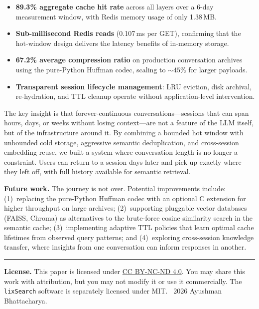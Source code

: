 \documentclass[conference]{IEEEtran}
\begin{document}
\begin{itemize}
\item \textbf{89.3\% aggregate cache hit rate} across all layers over a 6-day measurement window, with Redis memory usage of only 1.38\,MB.
\item \textbf{Sub-millisecond Redis reads} (0.107\,ms per GET), confirming that the hot-window design delivers the latency benefits of in-memory storage.
\item \textbf{67.2\% average compression ratio} on production conversation archives using the pure-Python Huffman codec, scaling to ${\sim}45\%$ for larger payloads.
\item \textbf{Transparent session lifecycle management}: LRU eviction, disk archival, re-hydration, and TTL cleanup operate without application-level intervention.
\end{itemize}

The key insight is that forever-continuous conversations---sessions that can span hours, days, or weeks without losing context---are not a feature of the LLM itself, but of the infrastructure around it. By combining a bounded hot window with unbounded cold storage, aggressive semantic deduplication, and cross-session embedding reuse, we built a system where conversation length is no longer a constraint. Users can return to a session days later and pick up exactly where they left off, with full history available for semantic retrieval.

\textbf{Future work.} The journey is not over. Potential improvements include: (1)~replacing the pure-Python Huffman codec with an optional C extension for higher throughput on large archives; (2)~supporting pluggable vector databases (FAISS, Chroma) as alternatives to the brute-force cosine similarity search in the semantic cache; (3)~implementing adaptive TTL policies that learn optimal cache lifetimes from observed query patterns; and (4)~exploring cross-session knowledge transfer, where insights from one conversation can inform responses in another.

\vspace{0.5em}
\noindent\rule{\columnwidth}{0.4pt}
{\footnotesize \textbf{License.} This paper is licensed under \href{https://creativecommons.org/licenses/by-nc-nd/4.0/}{CC BY-NC-ND 4.0}. You may share this work with attribution, but you may not modify it or use it commercially. The \texttt{lixSearch} software is separately licensed under MIT. \textcopyright~2026 Ayushman Bhattacharya.}
\end{document}
